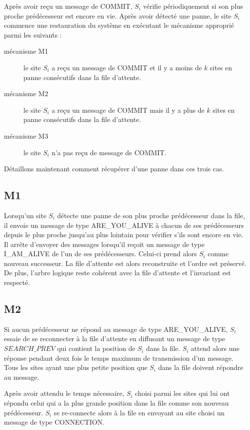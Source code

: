 Après avoir reçu un message de COMMIT, $S_i$ vérifie périodiquement si son plus proche prédécesseur est encore en vie. Après avoir détecté une panne, le site $S_i$ commence une restauration du système en exécutant le mécanisme approprié parmi les suivants :
\begin{description}
\item[mécanisme M1] le site $S_i$ a reçu un message de COMMIT et il y a moins de $k$ sites en panne consécutifs dans la file d'attente.
\item[mécanisme M2] le site $S_i$ a reçu un message de COMMIT mais il y a plus de $k$ sites en panne consécutifs dans la file d'attente.
\item[mécanisme M3] le site $S_i$ n'a pas reçu de message de COMMIT.
\end{description}
Détaillons maintenant comment récupérer d'une panne dans ces trois cas.

\subsection{M1}
Lorsqu'un site $S_i$ détecte une panne de son plus proche prédécesseur dans la file, il envoie un message de type ARE\_YOU\_ALIVE à chacun de ses prédécesseurs depuis le plus proche jusqu'au plus lointain pour vérifier s'ils sont encore en vie.
Il arrête d'envoyer des messages lorsqu'il reçoit un message de type I\_AM\_ALIVE de l'un de ses prédécesseurs. Celui-ci prend alors $S_i$ comme nouveau successeur. La file d'attente est alors reconstruite et l'ordre est préservé. De plus, l'arbre logique reste cohérent avec la file d'attente et l'invariant est respecté.

\subsection{M2}
Si aucun prédécesseur ne répond au message de type ARE\_YOU\_ALIVE, $S_i$ essaie de se reconnecter à la file d'attente en diffusant un message de type $SEARCH\_PREV$ qui contient la position de $S_i$ dans la file. $S_i$ attend alors une réponse pendant deux fois le temps maximum de transmission d'un message. Tous les sites ayant une plus petite position que $S_i$ dans la file doivent répondre au message.

Après avoir attendu le temps nécessaire, $S_i$ choisi parmi les sites qui lui ont répondu celui qui a la plus grande position dans la file comme son nouveau prédécesseur. $S_i$ se re-connecte alors à la file en envoyant au site choisi un message de type CONNECTION.


